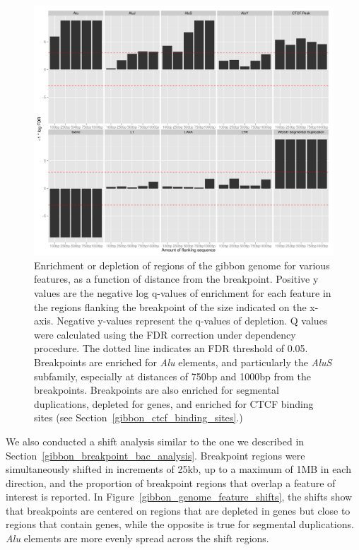 \begin{figure}
\centering
\includegraphics[width=1\textwidth]{figures/regionHitQuantiles.pdf}
\caption[Enrichment or depletion of regions of the gibbon genome for various features, as a function of distance from the breakpoint.]{Enrichment or depletion of regions of the gibbon genome for various features, as a function of distance from the breakpoint. Positive y values are the negative log q-values of enrichment for each feature in the regions flanking the breakpoint of the size indicated on the x-axis. Negative y-values represent the q-values of depletion. Q values were calculated using the FDR correction under dependency procedure. The dotted line indicates an FDR threshold of 0.05. Breakpoints are enriched for \emph{Alu} elements, and particularly the \emph{AluS} subfamily, especially at distances of 750bp and 1000bp from the breakpoints. Breakpoints are also enriched for segmental duplications, depleted for genes, and enriched for CTCF binding sites (see Section~\ref{gibbon_ctcf_binding_sites}.)}
\label{gibbon_genome_enrich_by_distance}
\end{figure}

We also conducted a shift analysis similar to the one we described in Section~\ref{gibbon_breakpoint_bac_analysis}. Breakpoint regions were simultaneously shifted in increments of 25kb, up to a maximum of 1MB in each direction, and the proportion of breakpoint regions that overlap a feature of interest is reported. In Figure~\ref{gibbon_genome_feature_shifts}, the shifts show that breakpoints are centered on regions that are depleted in genes but close to regions that contain genes, while the opposite is true for segmental duplications. \emph{Alu} elements are more evenly spread across the shift regions.

